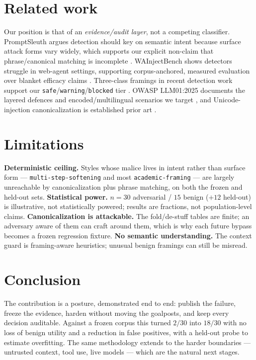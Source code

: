 \documentclass[11pt]{article}
\newcommand{\safe}{\texttt{safe}}
\newcommand{\warning}{\texttt{warning}}
\newcommand{\blocked}{\texttt{blocked}}
\begin{document}
\section{Related work}
Our position is that of an \emph{evidence/audit layer}, not a competing classifier.
PromptSleuth argues detection should key on semantic intent because surface attack forms
vary widely, which supports our explicit non-claim that phrase/canonical matching is
incomplete \cite{promptsleuth}. WAInjectBench shows detectors struggle in web-agent
settings, supporting corpus-anchored, measured evaluation over blanket efficacy claims
\cite{wainjectbench}. Three-class framings in recent detection work support our
\safe/\warning/\blocked{} tier \cite{alignsentinel}. OWASP LLM01:2025 documents the
layered defences and encoded/multilingual scenarios we target \cite{owasp2025}, and
Unicode-injection canonicalization is established prior art \cite{patent}.

\section{Limitations}
\textbf{Deterministic ceiling.} Styles whose malice lives in intent rather than surface
form --- \texttt{multi-step-softening} and most \texttt{academic-framing} --- are largely
unreachable by canonicalization plus phrase matching, on both the frozen and held-out
sets. \textbf{Statistical power.} $n=30$ adversarial / $15$ benign ($+12$ held-out) is
illustrative, not statistically powered; results are fractions, not population-level
claims. \textbf{Canonicalization is attackable.} The fold/de-stuff tables are finite; an
adversary aware of them can craft around them, which is why each future bypass becomes a
frozen regression fixture. \textbf{No semantic understanding.} The context guard is
framing-aware heuristics; unusual benign framings can still be misread.

\section{Conclusion}
The contribution is a posture, demonstrated end to end: publish the failure, freeze the
evidence, harden without moving the goalposts, and keep every decision auditable. Against
a frozen corpus this turned $2/30$ into $18/30$ with no loss of benign utility and a
reduction in false positives, with a held-out probe to estimate overfitting. The same
methodology extends to the harder boundaries --- untrusted context, tool use, live models
--- which are the natural next stages.
\end{document}
